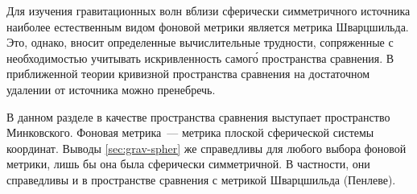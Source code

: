 \documentclass[\docroot/reports/draft/report.tex]{subfiles}
\begin{document}
Для изучения гравитационных волн вблизи сферически симметричного источника наиболее естественным видом фоновой метрики является метрика Шварцшильда. Это, однако, вносит определенные вычислительные трудности, сопряженные с необходимостью учитывать искривленность самог\'{о} пространства сравнения. В приближенной теории кривизной пространства сравнения на достаточном удалении от источника можно пренебречь.

В данном разделе в качестве пространства сравнения выступает пространство Минковского. Фоновая метрика~--- метрика плоской сферической системы координат. Выводы \autoref{sec:grav-spher} же справедливы для любого выбора фоновой метрики, лишь бы она была сферически симметричной. В частности, они справедливы и в пространстве сравнения с метрикой Шварцшильда (Пенлеве).
\end{document}
